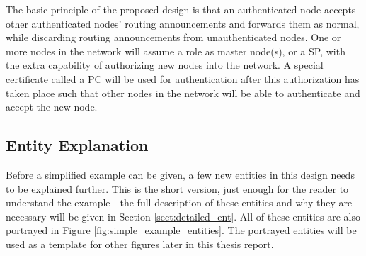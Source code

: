 The basic principle of the proposed design is that an authenticated node accepts
other authenticated nodes' routing announcements and forwards them as normal, while
discarding routing announcements from unauthenticated nodes. One or more nodes in the
network will assume a role as master node(s), or a \ac{SP}, with the extra
capability of authorizing new nodes into the network. A special certificate
called a \ac{PC} \cite{rfc3820} will be used for authentication after this
authorization has taken place such that other nodes in the network will be able
to authenticate and accept the new node.

\subsection{Entity Explanation}
Before a simplified example can be given, a few new entities in this design
needs to be explained further. This is the short version, just enough for the
reader to understand the example - the full description of these entities
and why they are necessary will be given in Section \ref{sect:detailed_ent}. All
of these entities are also portrayed in Figure
\ref{fig:simple_example_entities}. The portrayed entities will be used as a
template for other figures later in this thesis report.


